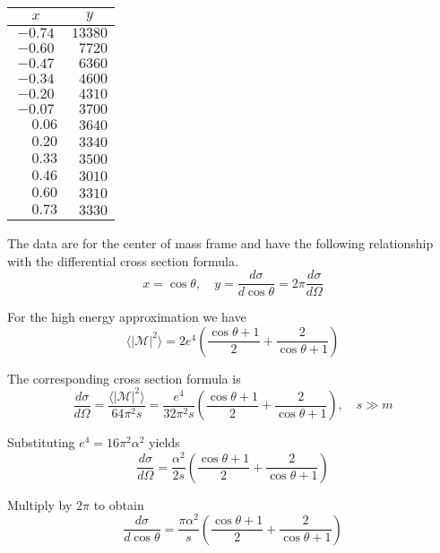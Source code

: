 \documentclass[12pt]{article}
\begin{document}
\begin{center}
\begin{tabular}{|c|c|}
\hline
$x$ & $y$\\
\hline
$-0.74$ & $13380$\\
$-0.60$ & $\phantom{0}7720$\\
$-0.47$ & $\phantom{0}6360$\\
$-0.34$ & $\phantom{0}4600$\\
$-0.20$ & $\phantom{0}4310$\\
$-0.07$ & $\phantom{0}3700$\\
$\phantom{+}0.06$ & $\phantom{0}3640$\\
$\phantom{+}0.20$ & $\phantom{0}3340$\\
$\phantom{+}0.33$ & $\phantom{0}3500$\\
$\phantom{+}0.46$ & $\phantom{0}3010$\\
$\phantom{+}0.60$ & $\phantom{0}3310$\\
$\phantom{+}0.73$ & $\phantom{0}3330$\\
\hline
\end{tabular}
\end{center}

The data are for the center of mass frame and have the following relationship with the differential cross section formula.
\begin{equation*}
x=\cos\theta,
\quad
y=\frac{d\sigma}{d\cos\theta}=2\pi\frac{d\sigma}{d\Omega}
\end{equation*}

For the high energy approximation we have
\begin{equation*}
\langle|\mathcal{M}|^2\rangle
=
2e^4\left(
\frac{\cos\theta+1}{2}+\frac{2}{\cos\theta+1}
\right)
\end{equation*}

The corresponding cross section formula is
\begin{equation*}
\frac{d\sigma}{d\Omega}
=\frac{\langle|\mathcal{M}|^2\rangle}{64\pi^2s}
=\frac{e^4}{32\pi^2s}
\left(
\frac{\cos\theta+1}{2}+\frac{2}{\cos\theta+1}
\right),\quad s\gg m
\end{equation*}

Substituting $e^4=16\pi^2\alpha^2$ yields
\begin{equation*}
\frac{d\sigma}{d\Omega}
=\frac{\alpha^2}{2s}
\left(
\frac{\cos\theta+1}{2}+\frac{2}{\cos\theta+1}
\right)
\end{equation*}

Multiply by $2\pi$ to obtain
\begin{equation*}
\frac{d\sigma}{d\cos\theta}
=\frac{\pi\alpha^2}{s}\left(
\frac{\cos\theta+1}{2}+\frac{2}{\cos\theta+1}
\right)
\end{equation*}
\end{document}
